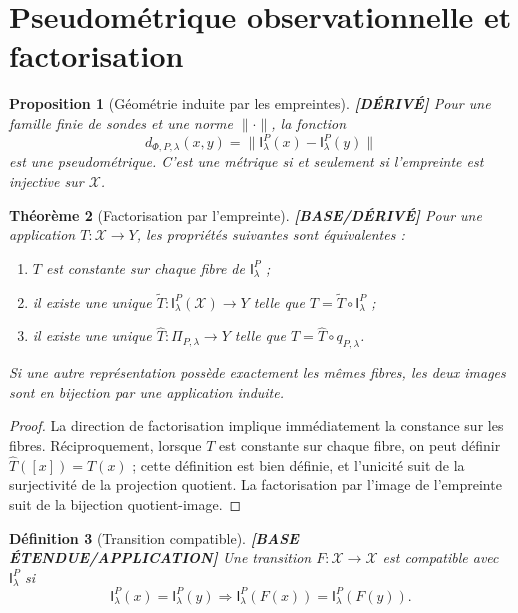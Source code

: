 \documentclass[11pt,a4paper]{article}
\newtheorem{definition}{Définition}[section]
\newtheorem{proposition}[definition]{Proposition}
\newtheorem{theorem}[definition]{Théorème}
\theoremstyle{remark}
\newcommand{\X}{\mathcal X}
\newcommand{\Emp}{\mathsf I}
\begin{document}
\section{Pseudométrique observationnelle et factorisation}

\begin{proposition}[Géométrie induite par les empreintes] \textbf{[DÉRIVÉ]}
Pour une famille finie de sondes et une norme $\|\cdot\|$, la fonction
\[
d_{\Phi,P,\lambda}(x,y)=\|\Emp_\lambda^P(x)-\Emp_\lambda^P(y)\|
\]
est une pseudométrique. C'est une métrique si et seulement si l'empreinte est injective sur $\X$.
\end{proposition}

\begin{theorem}[Factorisation par l'empreinte] \textbf{[BASE/DÉRIVÉ]}
Pour une application $T:\X\to Y$, les propriétés suivantes sont équivalentes :
\begin{enumerate}[label=(\arabic*)]
\item $T$ est constante sur chaque fibre de $\Emp_\lambda^P$ ;
\item il existe une unique $\widetilde T:\Emp_\lambda^P(\X)\to Y$ telle que $T=\widetilde T\circ\Emp_\lambda^P$ ;
\item il existe une unique $\widehat T:\Pi_{P,\lambda}\to Y$ telle que $T=\widehat T\circ q_{P,\lambda}$.
\end{enumerate}
Si une autre représentation possède exactement les mêmes fibres, les deux images sont en bijection par une application induite.
\end{theorem}
\begin{proof}
La direction de factorisation implique immédiatement la constance sur les fibres. Réciproquement, lorsque $T$ est constante sur chaque fibre, on peut définir $\widehat T([x])=T(x)$ ; cette définition est bien définie, et l'unicité suit de la surjectivité de la projection quotient. La factorisation par l'image de l'empreinte suit de la bijection quotient-image.
\end{proof}

\begin{definition}[Transition compatible] \textbf{[BASE ÉTENDUE/APPLICATION]}
Une transition $F:\X\to\X$ est compatible avec $\Emp_\lambda^P$ si
\[
\Emp_\lambda^P(x)=\Emp_\lambda^P(y)\Rightarrow\Emp_\lambda^P(F(x))=\Emp_\lambda^P(F(y)).
\]
\end{definition}
\end{document}
